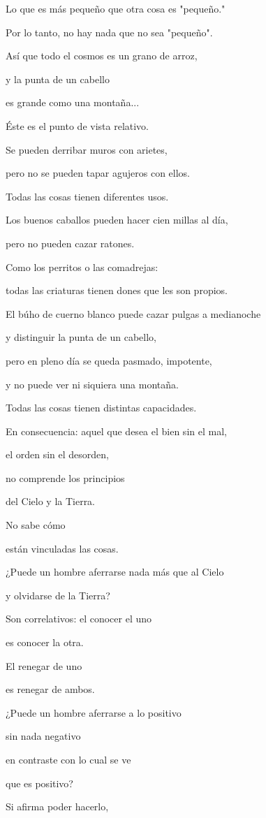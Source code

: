 Lo que es más pequeño que otra cosa es "pequeño."

Por lo tanto, no hay nada que no sea "pequeño".

Así que todo el cosmos es un grano de arroz,

y la punta de un cabello

es grande como una montaña...

Éste es el punto de vista relativo.

Se pueden derribar muros con arietes,

pero no se pueden tapar agujeros con ellos.

Todas las cosas tienen diferentes usos.

Los buenos caballos pueden hacer cien millas al día,

pero no pueden cazar ratones.

Como los perritos o las comadrejas:

todas las criaturas tienen dones que les son propios.

El búho de cuerno blanco puede cazar pulgas a medianoche

y distinguir la punta de un cabello,

pero en pleno día se queda pasmado, impotente,

y no puede ver ni siquiera una montaña.

Todas las cosas tienen distintas capacidades.

En consecuencia: aquel que desea el bien sin el mal,

el orden sin el desorden,

no comprende los principios

del Cielo y la Tierra.

No sabe cómo

están vinculadas las cosas.

¿Puede un hombre aferrarse nada más que al Cielo

y olvidarse de la Tierra?

Son correlativos: el conocer el uno

es conocer la otra.

El renegar de uno

es renegar de ambos.

¿Puede un hombre aferrarse a lo positivo

sin nada negativo

en contraste con lo cual se ve

que es positivo?

Si afirma poder hacerlo,

